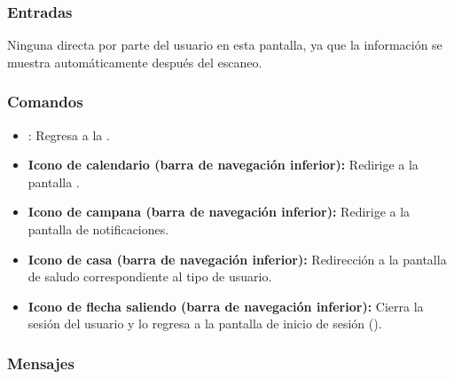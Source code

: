 \subsubsection{Entradas}
Ninguna directa por parte del usuario en esta pantalla, ya que la información se muestra automáticamente después del escaneo.

\subsubsection{Comandos}
\begin{itemize}
	\item {}: Regresa a la .
	\item \textbf{Icono de calendario (barra de navegación inferior):} Redirige a la pantalla .
	\item \textbf{Icono de campana (barra de navegación inferior):} Redirige a la pantalla de notificaciones.
	\item \textbf{Icono de casa (barra de navegación inferior):} Redirección a la pantalla de saludo correspondiente al tipo de usuario.
	\item \textbf{Icono de flecha saliendo (barra de navegación inferior):} Cierra la sesión del usuario y lo regresa a la pantalla de inicio de sesión ().
\end{itemize}

\subsubsection{Mensajes}


